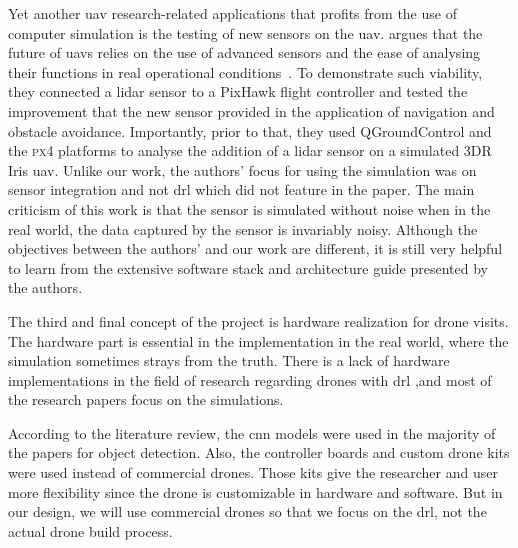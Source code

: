\documentclass[../main.tex]{subfiles}
\begin{document}
Yet another \gls{uav} research-related applications 
that profits from the use of computer simulation 
is the testing of new sensors on the \gls{uav}.
\citeauthor{Gar20} argues that the future of \glspl{uav}
relies on the use of advanced sensors and 
the ease of analysing their functions
in real operational conditions~\cite{Gar20}.
To demonstrate such viability, they connected a \gls{lidar} sensor
to a PixHawk flight controller and tested the improvement
that the new sensor provided
in the application of navigation and obstacle avoidance.
Importantly, prior to that, they used QGroundControl and the \textsc{px4}
platforms to analyse the addition of a \gls{lidar} sensor
on a simulated 3DR Iris \gls{uav}.
Unlike our work, the authors' focus for using the simulation
was on sensor integration and not \gls{drl} 
which did not feature in the paper. 
The main criticism of this work is that 
the sensor is simulated without noise
when in the real world, the data captured
by the sensor is invariably noisy.
Although the objectives between the authors' and our work
are different, it is still very helpful to learn from
the extensive software stack and architecture guide 
presented by the authors.



The third and final concept of the project is hardware realization for drone visits. The hardware part is essential in the implementation in the real world, where the simulation sometimes strays from the truth.
There is a lack of hardware implementations in the field of research regarding drones with \gls{drl} ,and most of the research papers focus on the simulations.

According to the literature review, 
the \gls{cnn} models were used in the majority of the papers for object detection. 
Also, the controller boards and custom drone kits were used instead of commercial drones. Those kits give the researcher and user more flexibility since the drone is customizable in hardware and software. But in our design, we will use commercial drones so that we focus on the \gls{drl}, not the actual drone build process. 

\end{document}

